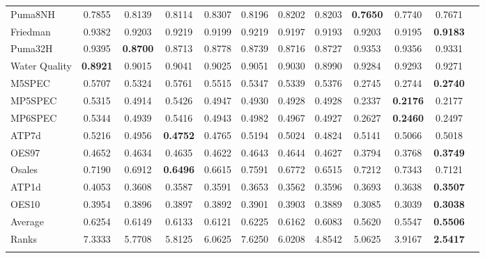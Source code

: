 \documentclass[reqno]{vcuthesis}
\numberwithin{equation}{chapter}
\begin{document}
\begin{table}[t!]
{\begin{tabular}{l@{\extracolsep{\fill}}ccccccccccc}
Puma8NH &0.7855 &0.8139 &0.8114 &0.8307 &0.8196 &0.8202 &0.8203 &\textbf{0.7650} &0.7740 &0.7671 &  \\
Friedman &0.9382 &0.9203 &0.9219 &0.9199 &0.9219 &0.9197 &0.9193 &0.9203 &0.9195 &\textbf{0.9183} &  \\
Puma32H &0.9395 &\textbf{0.8700} &0.8713 &0.8778 &0.8739 &0.8716 &0.8727 &0.9353 &0.9356 &0.9331 &  \\
Water Quality &\textbf{0.8921} &0.9015 &0.9041 &0.9025 &0.9051 &0.9030 &0.8990 &0.9284 &0.9293 &0.9271 &  \\
M5SPEC &0.5707 &0.5324 &0.5761 &0.5515 &0.5347 &0.5339 &0.5376 &0.2745 &0.2744 &\textbf{0.2740} &  \\
MP5SPEC &0.5315 &0.4914 &0.5426 &0.4947 &0.4930 &0.4928 &0.4928 &0.2337 &\textbf{0.2176} &0.2177 &  \\
MP6SPEC &0.5344 &0.4939 &0.5416 &0.4943 &0.4982 &0.4967 &0.4927 &0.2627 &\textbf{0.2460} &0.2497 &  \\
ATP7d &0.5216 &0.4956 &\textbf{0.4752} &0.4765 &0.5194 &0.5024 &0.4824 &0.5141 &0.5066 &0.5018 &  \\
OES97 &0.4652 &0.4634 &0.4635 &0.4622 &0.4643 &0.4644 &0.4627 &0.3794 &0.3768 &\textbf{0.3749} &  \\
Osales &0.7190 &0.6912 &\textbf{0.6496} &0.6615 &0.7591 &0.6772 &0.6515 &0.7212 &0.7343 &0.7121 &  \\
ATP1d &0.4053 &0.3608 &0.3587 &0.3591 &0.3653 &0.3562 &0.3596 &0.3693 &0.3638 &\textbf{0.3507} &  \\
OES10 &0.3954 &0.3896 &0.3897 &0.3892 &0.3901 &0.3903 &0.3889 &0.3085 &0.3039 &\textbf{0.3038} &  \\
\noalign{\smallskip}\hline\noalign{\smallskip}
Average &0.6254 &0.6149 &0.6133 &0.6121 &0.6225 &0.6162 &0.6083 &0.5620 &0.5547 &\textbf{0.5506} &  \\
Ranks &7.3333 &5.7708 &5.8125 &6.0625 &7.6250 &6.0208 &4.8542 &5.0625 &3.9167 &\textbf{2.5417} &  \\
\noalign{\smallskip}\hline
\end{tabular}}
\centering \small
{}
\end{table}
\end{document}
